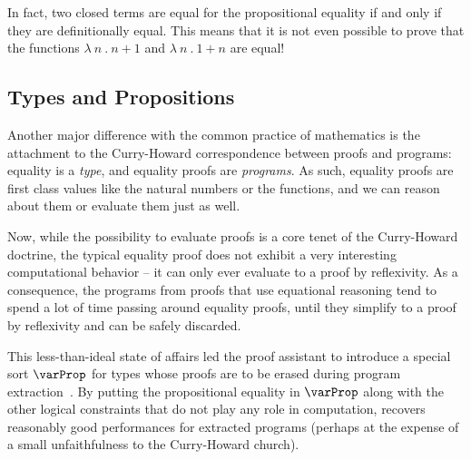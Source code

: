 In fact, two closed terms are equal for the propositional equality if
and only if they are definitionally equal.
This means that it is not even possible to prove that the functions
\( {\lambda\ n\ .\ n+1} \) and \( {\lambda\ n\ .\ 1+n} \) are equal!

\subsection{Types and Propositions}

Another major difference with the common practice of mathematics is the 
attachment to the Curry-Howard correspondence between proofs and programs:
equality is a \emph{type}, and equality proofs are \emph{programs}.
% 
As such, equality proofs are first class values like the natural numbers
or the functions, and we can reason about them or evaluate them just as well.

Now, while the possibility to evaluate proofs is a core tenet of the Curry-Howard
doctrine, the typical equality proof does not exhibit a very interesting 
computational behavior -- it can only ever evaluate to a proof by reflexivity.
% 
As a consequence, the programs 
from proofs that use equational reasoning 
tend to spend a lot of time passing around equality proofs, until they 
simplify to a proof by reflexivity and can be safely discarded.

This less-than-ideal state of affairs led the \Coq proof assistant to introduce
a special sort \( \varProp \) for types whose proofs are to be erased during 
program extraction~.
% 
By putting the propositional equality in \( \varProp \) along with the other logical 
constraints that do not play any role in computation, \Coq recovers reasonably good 
performances for extracted programs (perhaps at the expense of a small 
unfaithfulness to the Curry-Howard church).


